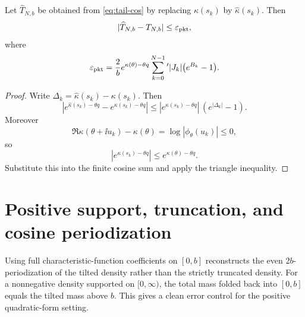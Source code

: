 \begin{theorem}
\label{thm:packet-tail}
Let $\widehat T_{N,b}$ be obtained from \eqref{eq:tail-cos} by replacing $\kappa(s_k)$ by $\widehat\kappa(s_k)$. Then
\begin{equation}
|\widehat T_{N,b}-T_{N,b}|
\le \varepsilon_{\mathrm{pkt}},
\label{eq:packet-tail-bound}
\end{equation}
where
\begin{equation}
\varepsilon_{\mathrm{pkt}}
=
\frac{2}{b}
 e^{\kappa(\theta)-\theta q}
\sum_{k=0}^{N-1}{}'
|J_k|\bigl(e^{B_k}-1\bigr).
\label{eq:eps-pkt}
\end{equation}
\end{theorem}

\begin{proof}
Write $\Delta_k=\widehat\kappa(s_k)-\kappa(s_k)$. Then
\[
|e^{\widehat\kappa(s_k)-\theta q}-e^{\kappa(s_k)-\theta q}|
\le
|e^{\kappa(s_k)-\theta q}|\,(e^{|\Delta_k|}-1).
\]
Moreover
\[
\Re\kappa(\theta+\ii u_k)-\kappa(\theta)
=\log|\phi_{\theta}(u_k)|\le0,
\]
so
\[
|e^{\kappa(s_k)-\theta q}|
\le e^{\kappa(\theta)-\theta q}.
\]
Substitute this into the finite cosine sum and apply the triangle inequality.
\end{proof}

\section{Positive support, truncation, and cosine periodization}

Using full characteristic-function coefficients on $[0,b]$ reconstructs the even $2b$-periodization of the tilted density rather than the strictly truncated density. For a nonnegative density supported on $[0,\infty)$, the total mass folded back into $[0,b]$ equals the tilted mass above $b$. This gives a clean error control for the positive quadratic-form setting.


